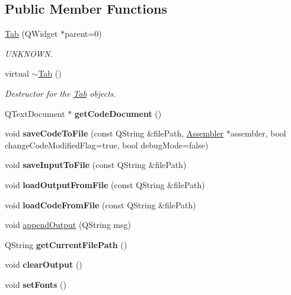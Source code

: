 \subsection*{Public Member Functions}
\begin{DoxyCompactItemize}
\item 
\hyperlink{class_tab_a3e967f9ec671509bfab71e919c838876}{Tab} (Q\+Widget $\ast$parent=0)
\begin{DoxyCompactList}\small\item\em U\+N\+K\+N\+O\+W\+N. \end{DoxyCompactList}\item 
virtual \hyperlink{class_tab_a8cc210bcede02daa21145bb1675c3c80}{$\sim$\+Tab} ()
\begin{DoxyCompactList}\small\item\em Destructor for the \hyperlink{class_tab}{Tab} objects. \end{DoxyCompactList}\item 
\hypertarget{class_tab_a28ed89a733484410df7455110425c50d}{}Q\+Text\+Document $\ast$ {\bfseries get\+Code\+Document} ()\label{class_tab_a28ed89a733484410df7455110425c50d}

\item 
\hypertarget{class_tab_aff2b75621d226d4941670b66450c574b}{}void {\bfseries save\+Code\+To\+File} (const Q\+String \&file\+Path, \hyperlink{class_assembler}{Assembler} $\ast$assembler, bool change\+Code\+Modified\+Flag=true, bool debug\+Mode=false)\label{class_tab_aff2b75621d226d4941670b66450c574b}

\item 
\hypertarget{class_tab_a26b069ece03c8df2fe26a98bc5c0f985}{}void {\bfseries save\+Input\+To\+File} (const Q\+String \&file\+Path)\label{class_tab_a26b069ece03c8df2fe26a98bc5c0f985}

\item 
\hypertarget{class_tab_afc158a43658eba563e286bc8385745da}{}void {\bfseries load\+Output\+From\+File} (const Q\+String \&file\+Path)\label{class_tab_afc158a43658eba563e286bc8385745da}

\item 
\hypertarget{class_tab_a8e95ad5c45974adfe3f2c76a370c5364}{}void {\bfseries load\+Code\+From\+File} (const Q\+String \&file\+Path)\label{class_tab_a8e95ad5c45974adfe3f2c76a370c5364}

\item 
void \hyperlink{class_tab_af4c53acabb77314b325490e7895c4bfb}{append\+Output} (Q\+String msg)
\item 
\hypertarget{class_tab_a3a7e86d4a00ee457caa53c56f2fb7595}{}Q\+String {\bfseries get\+Current\+File\+Path} ()\label{class_tab_a3a7e86d4a00ee457caa53c56f2fb7595}

\item 
\hypertarget{class_tab_a94288e7eebc73fa8c48611ea59afec24}{}void {\bfseries clear\+Output} ()\label{class_tab_a94288e7eebc73fa8c48611ea59afec24}

\item 
\hypertarget{class_tab_a4e545dbb1b91938197393089766202d1}{}void {\bfseries set\+Fonts} ()\label{class_tab_a4e545dbb1b91938197393089766202d1}

\end{DoxyCompactItemize}
